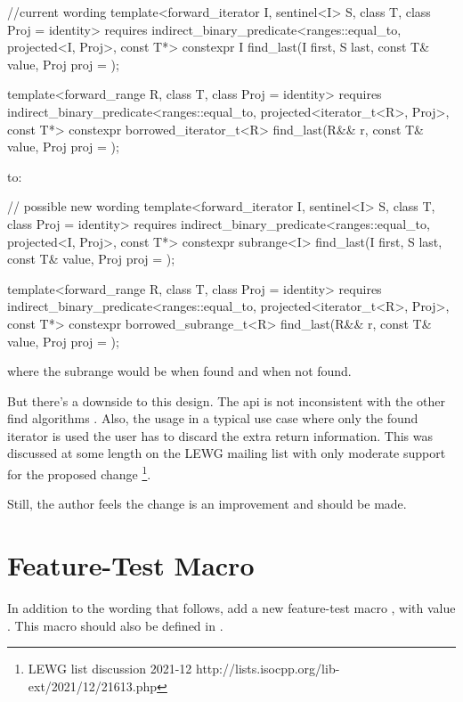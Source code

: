 \documentclass[ebook,10pt,oneside,openany,final]{memoir}
\begin{document}
\begin{itemdecl}
    //current wording
    template<forward_iterator I, sentinel<I> S, class T, class Proj = identity>
      requires indirect_binary_predicate<ranges::equal_to, projected<I, Proj>, const T*>
      constexpr I find_last(I first, S last, const T& value, Proj proj = {});

    template<forward_range R, class T, class Proj = identity>
      requires indirect_binary_predicate<ranges::equal_to, projected<iterator_t<R>, Proj>, const T*>
      constexpr borrowed_iterator_t<R>
        find_last(R&& r, const T& value, Proj proj = {});
\end{itemdecl}

to:

\begin{itemdecl}
    // possible new wording
    template<forward_iterator I, sentinel<I> S, class T, class Proj = identity>
      requires indirect_binary_predicate<ranges::equal_to, projected<I, Proj>, const T*>
      constexpr subrange<I> find_last(I first, S last, const T& value, Proj proj = {});

    template<forward_range R, class T, class Proj = identity>
      requires indirect_binary_predicate<ranges::equal_to, projected<iterator_t<R>, Proj>, const T*>
      constexpr borrowed_subrange_t<R>
        find_last(R&& r, const T& value, Proj proj = {});
\end{itemdecl}

where the subrange would be \tcode{[i, last)} when found and \tcode{[last, last)}
when not found.

But there's a downside to this design.  The api is not inconsistent with the other
find algorithms . Also, the usage in a typical use case
where only the found iterator is used the user has to discard the extra return
information. This was discussed at some length on the LEWG mailing list with only moderate support for the proposed change \footnote{LEWG list discussion 2021-12 http://lists.isocpp.org/lib-ext/2021/12/21613.php}.

Still, the author feels the change is an improvement and should be made.

\section{Feature-Test Macro}

In addition to the wording that follows, add a new feature-test macro
, with value .  This macro should also be
defined in .

\newcommand{\indexhdr}[1]{}
\newcommand{\indexlibrarymember}[2]{
}




\end{document}
